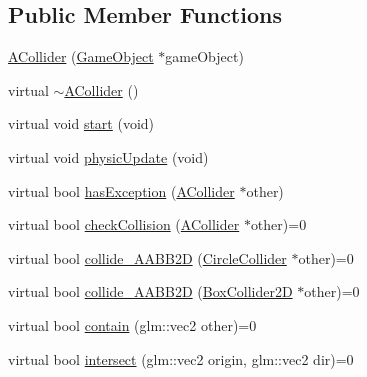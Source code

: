 \subsection*{Public Member Functions}
\begin{DoxyCompactItemize}
\item 
\mbox{\hyperlink{class_beer_engine_1_1_component_1_1_a_collider_a807a20c3c5c411d832d371523f02220c}{A\+Collider}} (\mbox{\hyperlink{class_beer_engine_1_1_game_object}{Game\+Object}} $\ast$game\+Object)
\item 
virtual \mbox{\hyperlink{class_beer_engine_1_1_component_1_1_a_collider_a10094dea61f15535b8707b7171adc15f}{$\sim$\+A\+Collider}} ()
\item 
virtual void \mbox{\hyperlink{class_beer_engine_1_1_component_1_1_a_collider_a5da2e0713f11237c7a963295f508cd3b}{start}} (void)
\item 
virtual void \mbox{\hyperlink{class_beer_engine_1_1_component_1_1_a_collider_a23a7d16be7b24965987d17a7549d3005}{physic\+Update}} (void)
\item 
virtual bool \mbox{\hyperlink{class_beer_engine_1_1_component_1_1_a_collider_a3d07cf39499899192c348016b6a97353}{has\+Exception}} (\mbox{\hyperlink{class_beer_engine_1_1_component_1_1_a_collider}{A\+Collider}} $\ast$other)
\item 
virtual bool \mbox{\hyperlink{class_beer_engine_1_1_component_1_1_a_collider_ad9367c0e75c941509322fb984d16de00}{check\+Collision}} (\mbox{\hyperlink{class_beer_engine_1_1_component_1_1_a_collider}{A\+Collider}} $\ast$other)=0
\item 
virtual bool \mbox{\hyperlink{class_beer_engine_1_1_component_1_1_a_collider_ab9acc12bf6017b81f3515264238ce3d5}{collide\+\_\+\+A\+A\+B\+B2D}} (\mbox{\hyperlink{class_beer_engine_1_1_component_1_1_circle_collider}{Circle\+Collider}} $\ast$other)=0
\item 
virtual bool \mbox{\hyperlink{class_beer_engine_1_1_component_1_1_a_collider_ae972d39620da804c72fb9799c167bf4b}{collide\+\_\+\+A\+A\+B\+B2D}} (\mbox{\hyperlink{class_beer_engine_1_1_component_1_1_box_collider2_d}{Box\+Collider2D}} $\ast$other)=0
\item 
virtual bool \mbox{\hyperlink{class_beer_engine_1_1_component_1_1_a_collider_a3d7b4784b8ba49a9d0fe72e8ff00ad1e}{contain}} (glm\+::vec2 other)=0
\item 
virtual bool \mbox{\hyperlink{class_beer_engine_1_1_component_1_1_a_collider_a84f924f6c0631f5f17b4e1852495a505}{intersect}} (glm\+::vec2 origin, glm\+::vec2 dir)=0
\item 

\end{DoxyCompactItemize}
